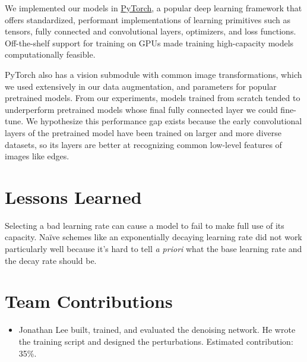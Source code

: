\documentclass[justified]{article}
\begin{document}
  We implemented our models in \href{https://pytorch.org/}{PyTorch}, a popular deep learning framework that offers standardized, performant implementations of learning primitives such as tensors, fully connected and convolutional layers, optimizers, and loss functions.
  Off-the-shelf support for training on GPUs made training high-capacity models computationally feasible.

  PyTorch also has a vision submodule with common image transformations, which we used extensively in our data augmentation, and parameters for popular pretrained models.
  From our experiments, models trained from scratch tended to underperform pretrained models whose final fully connected layer we could fine-tune.
  We hypothesize this performance gap exists because the early convolutional layers of the pretrained model have been trained on larger and more diverse datasets, so its layers are better at recognizing common low-level features of images like edges.

  \section{Lessons Learned}

  Selecting a bad learning rate can cause a model to fail to make full use of its capacity.
  Na\"{i}ve schemes like an exponentially decaying learning rate did not work particularly well because it's hard to tell \textit{a priori} what the base learning rate and the decay rate should be.

  \section{Team Contributions}

  \begin{itemize}
  \item
    Jonathan Lee built, trained, and evaluated the denoising network.
    He wrote the training script and designed the perturbations.
    Estimated contribution: 35\%.
  \end{itemize}
\end{document}
